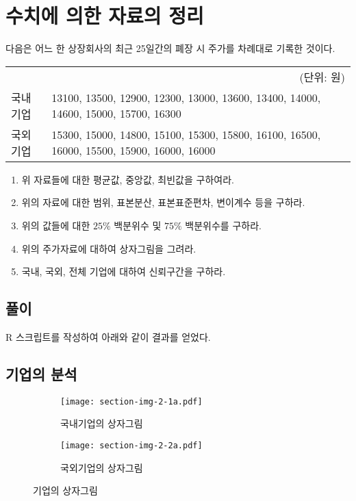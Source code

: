 \section{수치에 의한 자료의 정리}
다음은 어느 한 상장회사의 최근 25일간의 폐장 시 주가를 차례대로 기록한 것이다.

\begin{tabularx}{0.9\textwidth}{ l|X }
  \multicolumn{2}{r}{\small(단위: 원)} \\
  \noalign{\smallskip}\hline\noalign{\smallskip}
  국내기업 &
  13100, 13500, 12900, 12300, 13000, 13600, 13400, 14000, 14600, 15000,
  15700, 16300 \\
  국외기업 &
  15300, 15000, 14800, 15100, 15300, 15800, 16100, 16500, 16000, 15500,
  15900, 16000, 16000
\end{tabularx}

\begin{enumerate}
  \item 위 자료들에 대한 평균값, 중앙값, 최빈값을 구하여라.
  \item 위의 자료에 대한 범위, 표본분산, 표본표준편차, 변이계수 등을 구하라.
  \item 위의 값들에 대한 $25\%$ 백분위수 및 $75\%$ 백분위수를 구하라.
  \item 위의 주가자료에 대하여 상자그림을 그려라.
  \item 국내, 국외, 전체 기업에 대하여 신뢰구간을 구하라.
\end{enumerate}

\subsection{풀이}

R 스크립트를 작성하여 아래와 같이 결과를 얻었다.


\subsection{기업의 분석}
\begin{figure}[!hb]
  \begin{subfigure}{0.5\textwidth}
    \centering
    \texttt{[image: section-img-2-1a.pdf]}
    \caption{국내기업의 상자그림}
  \end{subfigure}
  \begin{subfigure}{0.5\textwidth}
    \centering
    \texttt{[image: section-img-2-2a.pdf]}
    \caption{국외기업의 상자그림}
  \end{subfigure}
  \caption{기업의 상자그림}
\end{figure}

